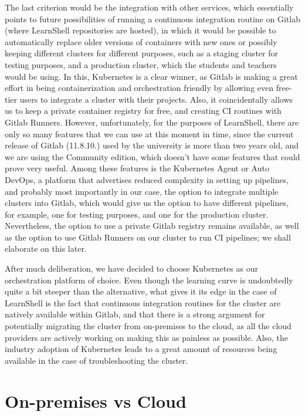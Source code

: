 \documentclass[thesis=B,english]{FITthesis}[2019/12/23]
\begin{document}
The last criterion would be the integration with other services, which essentially points to future possibilities of running a continuous integration routine on Gitlab (where LearnShell repositories are hosted), in which it would be possible to automatically replace older versions of containers with new ones or possibly keeping different clusters for different purposes, such as a staging cluster for testing purposes, and a production cluster, which the students and teachers would be using. In this, Kubernetes is a clear winner, as Gitlab is making a great effort in being containerization and orchestration friendly by allowing even free-tier users to integrate a cluster with their projects. \cite{gitlab-kube} Also, it coincidentally allows us to keep a private container registry for free, and creating CI routines with Gitlab Runners. However, unfortunately, for the purposes of LearnShell, there are only so many features that we can use at this moment in time, since the current release of Gitlab (11.8.10.) used by the university is more than two years old, and we are using the Community edition, which doesn't have some features that could prove very useful. Among these features is the Kubernetes Agent or Auto DevOps, a platform that advertises reduced complexity in setting up pipelines, and probably most importantly in our case, the option to integrate multiple clusters into Gitlab, which would give us the option to have different pipelines, for example, one for testing purposes, and one for the production cluster. Nevertheless, the option to use a private Gitlab registry remains available, as well as the option to use Gitlab Runners on our cluster to run CI pipelines; we shall elaborate on this later.

After much deliberation, we have decided to choose Kubernetes as our orchestration platform of choice. Even though the learning curve is undoubtedly quite a bit steeper than the alternative, what gives it its edge in the case of LearnShell is the fact that continuous integration routines for the cluster are natively available within Gitlab, and that there is a strong argument for potentially migrating the cluster from on-premises to the cloud, as all the cloud providers are actively working on making this as painless as possible. Also, the industry adoption of Kubernetes leads to a great amount of resources being available in the case of troubleshooting the cluster.

\section{On-premises vs Cloud}
\end{document}
